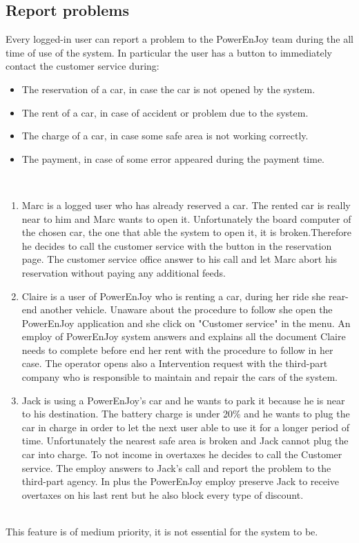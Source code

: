 \subsection{Report problems}
Every logged-in user can report a problem to the PowerEnJoy team during the all time of use of the system. In particular the user has a button to immediately contact the customer service during:
\begin{itemize}
	\item The reservation of a car, in case the car is not opened by the system.
	\item The rent of a car, in case of accident or problem due to the system.
	\item The charge of a car, in case some safe area is not working correctly.
	\item The payment, in case of some error appeared during the payment time.
\end{itemize}
 \ \\
\begin{enumerate}
	\item Marc is a logged user who has already reserved a car. The rented car is really near to him and Marc wants to open it. Unfortunately the board computer of the chosen car, the one that able the system to open it, it is broken.Therefore he decides to call the customer service with the button in the reservation page. The customer service office answer to his call and let Marc abort his reservation without paying any additional feeds.
	\item Claire is a user of PowerEnJoy who is renting a car, during her ride she rear-end another vehicle. Unaware about the procedure to follow she open the PowerEnJoy application and she click on "Customer service" in the menu. An employ of PowerEnJoy system answers and explains all the document Claire needs to complete before end her rent with the procedure to follow in her case. The operator opens also a Intervention request with the third-part company who is responsible to maintain and repair the cars of the system.
	\item Jack is using a PowerEnJoy's car and he wants to park it because he is near to his destination. The battery charge is under 20\% and he wants to plug the car in charge in order to let the next user able to use it for a longer period of time. Unfortunately the nearest safe area is broken and Jack cannot plug the car into charge. To not income in overtaxes he decides to call the Customer service. The employ answers to Jack's call and report the problem to the third-part agency. In plus the PowerEnJoy employ preserve Jack to receive overtaxes on his last rent but he also block every type of discount.
\end{enumerate}
 \ \\
This feature is of medium priority, it is not essential for the system to be.
